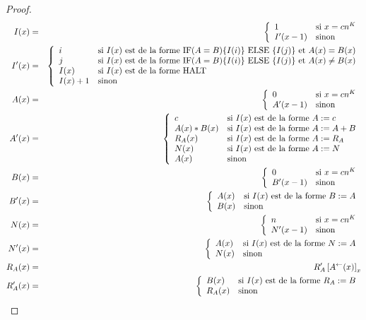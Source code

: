 \documentclass{article}
\newcommand{\sRAMif}[2]{\text{IF} (A=B) \{I( #1 )\} \text{ ELSE } \{I( #2 )\}}
\newcommand{\eqpred}[3]{#1\left[ #2^{\leftarrow}(#3) \right]_{#3}}
\begin{document}
\begin{proof}
{\begin{minipage}{0.9\textwidth}
				\setcounter{equation}{0}
				\begin{eqnarray}
					I(x) & = & \casedist{
							1			& 	\text{si $x = c n^K$} \\
							I'(x-1)		& 	\text{sinon}
							} \\
					I'(x) & = & \casedist{
							i			& 	\text{si $I(x)$ est de la forme $\sRAMif{i}{j}$ et $A(x) = B(x)$} \\
							j			& 	\text{si $I(x)$ est de la forme $\sRAMif{i}{j}$ et $A(x) \neq B(x)$} \\
							I(x)		&  	\text{si $I(x)$ est de la forme $\text{HALT}$} \\
							I(x) + 1 	& 	\text{sinon} 
							} \\
					A(x) & = & \casedist{
							0			& 	\text{si $x = cn^K$} \\
							A'(x-1)		& 	\text{sinon}
							} \\
					A'(x) & = & \casedist{
							c			& 	\text{si $I(x)$ est de la forme $A := c$} \\
							A(x) * B(x)	& 	\text{si $I(x)$ est de la forme $A := A + B$} \\
							R_A(x) 		& 	\text{si $I(x)$ est de la forme $A := R_A$} \\
							N(x)		& 	\text{si $I(x)$ est de la forme $A := N$} \\
							A(x)		& 	\text{sinon}
							} \\
					B(x) & = & \casedist{
							0			& 	\text{si $x = cn^K$} \\
							B'(x-1)		& 	\text{sinon}
							} \\
					B'(x) & = & \casedist{
							A(x)		& 	\text{si $I(x)$ est de la forme $B := A$} \\
							B(x)		& 	\text{sinon}
							} \\
					N(x) & = & \casedist{
							n			& 	\text{si $x = cn^K$} \\
							N'(x-1)		& 	\text{sinon}
							} \\
					N'(x) & = & \casedist{
							A(x)		& 	\text{si $I(x)$ est de la forme $N := A$} \\
							N(x)		& 	\text{sinon}
							} \\
					R_A(x) & = & \eqpred{R_A'}{A}{x} \\
					R_A'(x) & = & \casedist{
							B(x)		& 	\text{si $I(x)$ est de la forme $R_A := B$} \\
							R_A(x)		& 	\text{sinon}
							}
				\end{eqnarray}
			

\end{minipage}}
\end{proof}
\end{document}
